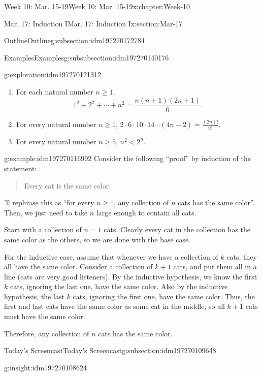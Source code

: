 \documentclass[oneside,10pt,]{book}
\numberwithin{equation}{section}
\renewcommand{\ge}{\geqslant}
\newcommand{\lt}{<}
\begin{document}
\begin{chapterptx}{Week 10: Mar. 15-19}{}{Week 10: Mar. 15-19}{}{}{x:chapter:Week-10}
\begin{sectionptx}{Mar. 17: Induction I}{}{Mar. 17: Induction I}{}{}{x:section:Mar-17}
\begin{subsectionptx}{Outline}{}{Outline}{}{}{g:subsection:idm197270172784}
\begin{subsubsectionptx}{Examples}{}{Examples}{}{}{g:subsubsection:idm197270140176}
\begin{exploration}{}{g:exploration:idm197270121312}
%
\begin{enumerate}
\item{}For each natural number \(n\ge 1\),%
\begin{equation*}
1^2 + 2^2 + \cdots + n^2 = \frac{n(n+1)(2n+1)}{6}.
\end{equation*}
%
\item{}For every natural number \(n\ge 1\), \(2\cdot 6\cdot 10 \cdot 14 \cdots (4n-2) = \frac{(2n)!}{n!}\).%
\item{}For every natural number \(n\ge 5\), \(n^2 \lt 2^n\).%
\end{enumerate}
\end{exploration}%
\begin{example}{}{g:example:idm197270116992}%
Consider the following ``proof'' by induction of the statement:%
\begin{quote}%
Every cat is the same color.\end{quote}
\par\smallskip%
\noindentWe'll rephrase this as ``for every \(n\ge 1\), any collection of \(n\) cats has the same color''. Then, we just need to take \(n\) large enough to contain all cats.%
\par
Start with a collection of \(n=1\) cats. Clearly every cat in the collection has the same color as the others, so we are done with the base case.%
\par
For the inductive case, assume that whenever we have a collection of \(k\) cats, they all have the same color. Consider a collection of \(k+1\) cats, and put them all in a line (cats are very good listeners). By the inductive hypothesis, we know the first \(k\) cats, ignoring the last one, have the same color. Also by the inductive hypothesis, the last \(k\) cats, ignoring the first one, have the same color. Thus, the first and last cats have the same color as some cat in the middle, so all \(k+1\) cats must have the same color.%
\par
Therefore, any collection of \(n\) cats has the same color.%
\end{example}
\end{subsubsectionptx}
\end{subsectionptx}
%
%
\typeout{************************************************}
\typeout{************************************************}
%
\begin{subsectionptx}{Today's Screencast}{}{Today's Screencast}{}{}{g:subsection:idm197270109648}
\begin{insight}{}{g:insight:idm197270108624}%

\end{insight}
\end{subsectionptx}
\end{sectionptx}
\end{chapterptx}
\end{document}
